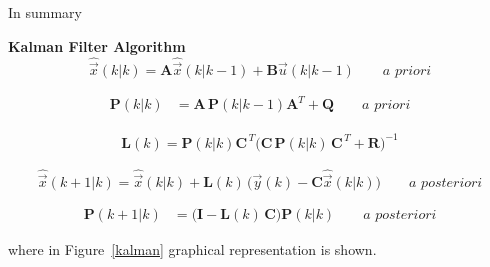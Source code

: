 \documentclass[11pt,a4paper,oneside]{book}
\numberwithin{equation}{section}
\theoremstyle{it}
\theoremstyle{definition}
\begin{document}
In summary
\begin{mybox}
	\noindent\textbf{Kalman Filter Algorithm}
	\begin{equation}\label{ks1}
		\hat{\vec{x}}\left(k|k\right) = \mathbf{A} 
		\hat{\vec{x}}\left(k|k-1\right) + \mathbf{B} \vec{u}\left(k|k-1\right) 
		\qquad \textit{a priori}
	\end{equation}
	
	\begin{equation}\label{ks2}
		\begin{aligned}
			\mathbf{P}\left(k|k\right) &= 
			\mathbf{A}\,\mathbf{P}\left(k|k-1\right) \mathbf{A}^T + \mathbf{Q} 
			\qquad \textit{a priori}
		\end{aligned}
	\end{equation}
	
	\begin{equation}\label{ks3}
		\begin{aligned}
			\mathbf{L}(k) = 
			\mathbf{P}(k|k)\mathbf{C}^{\,T}\Big(\mathbf{C}\,\mathbf{P}(k|k)\,\mathbf{C}^{\,T}+\mathbf{R}\Big)^{-1}
		\end{aligned}
	\end{equation}
	
	\begin{equation}\label{ks4}
		\hat{\vec{x}}\left(k+1|k\right) = \hat{\vec{x}}\left(k|k\right) + 
		\mathbf{L}(k)\, \Big(\vec{y}(k) - 
		\mathbf{C}\hat{\vec{x}}\left(k|k\right)\Big) \qquad \textit{a 
		posteriori}
	\end{equation}
	
	\begin{equation}\label{ks5}
		\begin{aligned}
			\mathbf{P}\left(k+1|k\right) &= 
			\Big(\mathbf{I}-\mathbf{L}(k)\,\mathbf{C} \Big) 
			\mathbf{P}\left(k|k\right)  \qquad \textit{a posteriori}
		\end{aligned}
	\end{equation}
\end{mybox}
where in Figure~\ref{kalman} graphical representation is shown.
\end{document}
